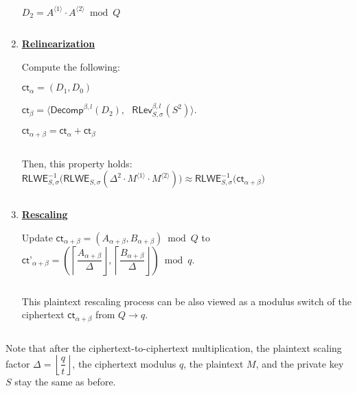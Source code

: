 \begin{tcolorbox}[title={\textbf{\tboxlabel{\ref*{subsubsec:bfv-mult-cipher-summary}} BFV's Ciphertext-to-Ciphertext Multiplication}}]
\begin{enumerate}
$D_2 = A^{\langle 1 \rangle} \cdot A^{\langle 2 \rangle} \bmod Q$


$ $

\item \textbf{\underline{Relinearization}} 


Compute the following:

$ \textsf{ct}_\alpha = (D
_1, D_0)$

$ \textsf{ct}_\beta = \bm{\langle} \textsf{Decomp}^{\beta, l}(D_2), \text{ } \textsf{RLev}_{S, \sigma}^{\beta, l}( S^2) \bm{\rangle}$.

$ \textsf{ct}_{\alpha + \beta} = \textsf{ct}_{\alpha} + \textsf{ct}_{\beta}$

$ $

Then, this property holds: $\textsf{RLWE}^{-1}_{S, \sigma}\bm(\textsf{RLWE}_{S, \sigma}(\Delta^2 \cdot M^{\langle 1 \rangle} \cdot M^{\langle 2 \rangle})\bm) \approx \textsf{RLWE}^{-1}_{S, \sigma}\bm{(}\textsf{ct}_{\alpha + \beta}\bm)$

$ $




\item \textbf{\underline{Rescaling}}

Update $\textsf{ct}_{\alpha + \beta} = (A_{\alpha + \beta}, B_{\alpha + \beta}) \bmod Q$ to $\textsf{ct'}_{\alpha + \beta} = \left(\left\lceil\dfrac{A_{\alpha + \beta}}{\Delta}\right\rfloor, \left\lceil\dfrac{B_{\alpha + \beta}}{\Delta}\right\rfloor\right) \bmod q$. 

$ $

This plaintext rescaling process can be also viewed as a modulus switch of the ciphertext $\textsf{ct}_{\alpha + \beta}$ from $Q \rightarrow q$. 


$ $

\end{enumerate}

Note that after the ciphertext-to-ciphertext multiplication, the plaintext scaling factor $\Delta=\left\lfloor\dfrac{q}{t}\right\rfloor$, the ciphertext modulus $q$, the plaintext $M$, and the private key $S$ stay the same as before.



\end{tcolorbox}


